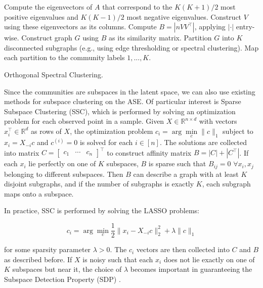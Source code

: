 \documentclass[
  11pt,
]{article}
\begin{document}
\begin{algorithm}[t]
  \DontPrintSemicolon
  \SetAlgoLined
    Compute the eigenvectors of $A$ that correspond to the $K (K+1) / 2$ most 
    positive eigenvalues and $K (K-1) / 2$ most negative eigenvalues. Construct 
    $V$ using these eigenvectors as its columns.\;
    Compute $B = |n V V^\top|$, applying $|\cdot|$ entry-wise.\;
    Construct graph $G$ using $B$ as its similarity matrix.\;
    Partition $G$ into $K$ disconnected subgraphs  
    (e.g., using edge thresholding or spectral clustering).\;
    Map each partition to the community labels $1, ..., K$.\;
  \caption{Orthogonal Spectral Clustering.}
\end{algorithm}

Since the communities are subspaces in the latent space, we can also use
existing methods for subspace clustering on the ASE. Of particular
interest is Sparse Subspace Clustering (SSC), which is performed by
solving an optimization problem for each observed point in a sample.
Given \(X \in \mathbb{R}^{n \times d}\) with vectors
\(x_i^\top \in \mathbb{R}^d\) as rows of \(X\), the optimization problem
\(c_i = \arg\min\limits_{c} \|c\|_1\) subject to \(x_i = X_{-i} c\) and
\(c^{(i)} = 0\) is solved for each \(i \in [n]\). The solutions are
collected into matrix
\(C = \begin{bmatrix} c_1 & \cdots & c_n \end{bmatrix}^\top\) to
construct affinity matrix \(B = |C| + |C^\top|\). If each \(x_i\) lie
perfectly on one of \(K\) subspaces, \(B\) is sparse such that
\(B_{ij} = 0\) \(\forall x_i, x_j\) belonging to different subspaces.
Then \(B\) can describe a graph with at least \(K\) disjoint subgraphs,
and if the number of subgraphs is exactly \(K\), each subgraph maps onto
a subspace.

In practice, SSC is performed by solving the LASSO problems:

\begin{equation} \label{eq:ssc}
c_i = \arg\min_c \frac{1}{2} \|x_i - X_{-i} c \|_2^2 + \lambda \|c\|_1
\end{equation}

for some sparsity parameter \(\lambda > 0\). The \(c_i\) vectors are
then collected into \(C\) and \(B\) as described before. If \(X\) is
noisy such that each \(x_i\) does not lie exactly on one of \(K\)
subspaces but near it, the choice of \(\lambda\) becomes important in
guaranteeing the Subspace Detection Property (SDP)
\cite{jmlr-v28-wang13}.
\end{document}
